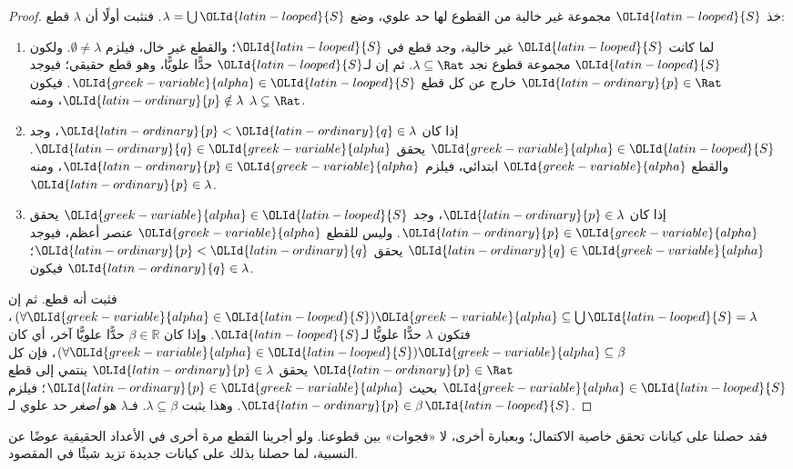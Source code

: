 \documentclass[../../../include/open-logic-section]{subfiles}
\begin{document}
\begin{proof}
خذ $\OLId{latin-looped}{S}$ مجموعة غير خالية من القطوع لها حد علوي، وضع $\lambda
= \bigcup \OLId{latin-looped}{S}$.
فنثبت أولًا أن $\lambda$ قطع:
\begin{enumerate}
\item لما كانت $\OLId{latin-looped}{S}$ غير خالية، وجد قطع في $\OLId{latin-looped}{S}$؛ والقطع غير خال، فيلزم $\emptyset \neq \lambda$. ولكون $\OLId{latin-looped}{S}$ مجموعة قطوع نجد $\lambda \subseteq \Rat$. ثم إن لـ$\OLId{latin-looped}{S}$ حدًّا علويًّا، وهو قطع حقيقي؛ فيوجد $\OLId{latin-ordinary}{p} \in
\Rat$ خارج عن كل قطع $ \OLId{greek-variable}{alpha} \in \OLId{latin-looped}{S}$. فيكون $\OLId{latin-ordinary}{p}\notin \lambda$، ومنه $\lambda \subsetneq \Rat$.
\item إذا كان $\OLId{latin-ordinary}{p} < \OLId{latin-ordinary}{q} \in \lambda$، وجد $ \OLId{greek-variable}{alpha} \in \OLId{latin-looped}{S}$ يحقق $\OLId{latin-ordinary}{q} \in \OLId{greek-variable}{alpha}$. والقطع $\OLId{greek-variable}{alpha}$ ابتدائي، فيلزم $\OLId{latin-ordinary}{p} \in \OLId{greek-variable}{alpha}$، ومنه $\OLId{latin-ordinary}{p} \in \lambda$.
\item إذا كان $\OLId{latin-ordinary}{p} \in \lambda$، وجد $ \OLId{greek-variable}{alpha} \in \OLId{latin-looped}{S}$ يحقق $\OLId{latin-ordinary}{p} \in
\OLId{greek-variable}{alpha}$. وليس للقطع $\OLId{greek-variable}{alpha}$ عنصر أعظم، فيوجد $\OLId{latin-ordinary}{q} \in \OLId{greek-variable}{alpha}$ يحقق $\OLId{latin-ordinary}{p} < \OLId{latin-ordinary}{q}$؛ فيكون $\OLId{latin-ordinary}{q} \in \lambda$.
\end{enumerate}
فثبت أنه قطع. ثم إن
$(\forall \OLId{greek-variable}{alpha} \in \OLId{latin-looped}{S})\OLId{greek-variable}{alpha} \subseteq \bigcup \OLId{latin-looped}{S} = \lambda$، فتكون $\lambda$ حدًّا علويًّا لـ$\OLId{latin-looped}{S}$. وإذا كان $\beta \in \mathbb{R}$ حدًّا علويًّا آخر، أي كان $(\forall \OLId{greek-variable}{alpha} \in \OLId{latin-looped}{S})\OLId{greek-variable}{alpha} \subseteq \beta$، فإن كل $\OLId{latin-ordinary}{p} \in \Rat$ يحقق $\OLId{latin-ordinary}{p} \in \lambda$ ينتمي إلى قطع $ \OLId{greek-variable}{alpha} \in \OLId{latin-looped}{S}$ بحيث $\OLId{latin-ordinary}{p} \in \OLId{greek-variable}{alpha}$؛ فيلزم $\OLId{latin-ordinary}{p} \in \beta$. وهذا يثبت $\lambda
\subseteq \beta$. فـ$\lambda$ هو \emph{أصغر} حد علوي لـ$\OLId{latin-looped}{S}$.
\end{proof}

فقد حصلنا على كيانات تحقق خاصية الاكتمال؛ وبعبارة أخرى، لا «فجوات» بين قطوعنا. ولو أجرينا القطع مرة أخرى في الأعداد الحقيقية عوضًا عن النسبية، لما حصلنا بذلك على كيانات جديدة تزيد شيئًا في المقصود.
\end{document}

